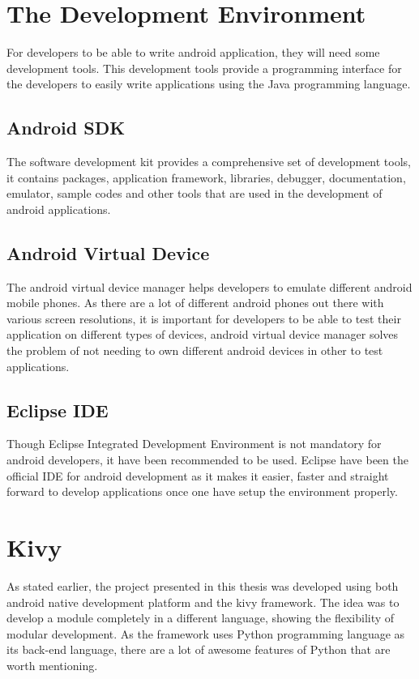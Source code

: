 \section{The Development Environment}
For developers to be able to write android application, they will need some development tools. This development tools provide a programming interface for the developers to easily write applications using the Java programming language.

\subsection{Android SDK}
The software development kit provides a comprehensive set of development tools, it contains packages, application framework, libraries, debugger, documentation, emulator, sample codes and other tools that are used in the development of android applications. 

\subsection{Android Virtual Device}
The android virtual device manager helps developers to emulate different android mobile phones. As there are a lot of different android phones out there with various screen resolutions, it is important for developers to be able to test their application on different types of devices, android virtual device manager solves the problem of not needing to own different android devices in other to test applications. 

\subsection{Eclipse IDE}
Though Eclipse Integrated Development Environment is not mandatory for android developers, it have been recommended to be used. Eclipse have been the official IDE for android development as it makes it easier, faster and straight forward to develop applications once one have setup the environment properly. 

\section{Kivy}
As stated earlier, the project presented in this thesis was developed using both android native development platform and the kivy framework. The idea was to develop a module completely in a different language, showing the flexibility of modular development. As the framework uses Python programming language as its back-end language, there are a lot of awesome features of Python that are worth mentioning.

